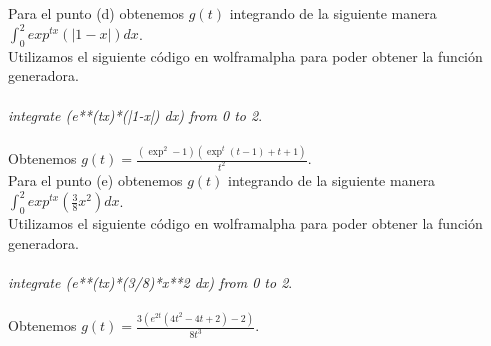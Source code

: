 \documentclass[]{article}
\begin{document}
Para el punto (d) obtenemos $g(t)$ integrando de la siguiente manera $\int_{0}^{2} exp^{tx}(|1-x|)dx$.\\
Utilizamos el siguiente código en wolframalpha para poder 
obtener la función generadora.\\
\\
\textit{integrate (e**(tx)*(|1-x|) dx) from 0 to 2}.\\
\\
Obtenemos $g(t) = \frac{(\exp^{2}-1)(\exp^{t}(t-1)+t+1)}{t^{2}}$.\\
Para el punto (e) obtenemos $g(t)$ integrando de la siguiente manera $\int_{0}^{2} exp^{tx}(\frac{3}{8}x^{2})dx$.\\
Utilizamos el siguiente código en wolframalpha para poder 
obtener la función generadora.\\
\\
\textit{integrate (e**(tx)*(3/8)*x**2 dx) from 0 to 2}.\\
\\
Obtenemos $g(t) = \frac{3(e^{2t}(4t^{2}-4t+2)-2)}{8t^{3}}$.\\
\end{document}
